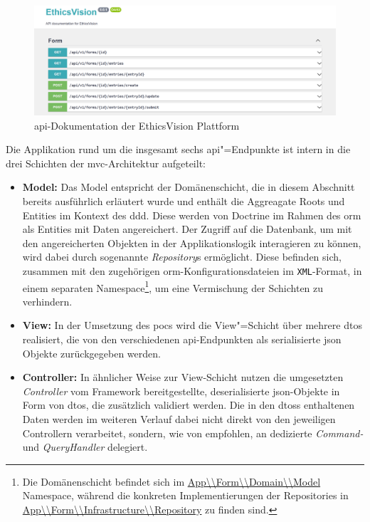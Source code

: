 \documentclass[a4paper,12pt,twoside]{scrreprt}
\begin{document}
\begin{figure}[ht]
    \centering
    \includegraphics[width=\linewidth]{thesis/images/Luidold_EthicsVision-API-Docs.png}
    \caption{\acs{api}-Dokumentation der EthicsVision Plattform}
    \label{fig:ethics-vision-api-docs}
\end{figure}

Die Applikation rund um die insgesamt sechs \ac{api}"=Endpunkte ist intern in die drei Schichten der \ac{mvc}-Architektur aufgeteilt:
\begin{itemize}
    \item \textbf{Model:} Das Model entspricht der Domänenschicht, die in diesem Abschnitt bereits ausführlich erläutert wurde und enthält die Aggreagate Roots und Entities im Kontext des \ac{ddd}. Diese werden von Doctrine im Rahmen des \ac{orm} als Entities mit Daten angereichert. Der Zugriff auf die Datenbank, um mit den angereicherten Objekten in der Applikationslogik interagieren zu können, wird dabei durch sogenannte \textit{Repository}s ermöglicht. Diese befinden sich, zusammen mit den zugehörigen \ac{orm}-Konfigurationsdateien im \texttt{XML}-Format, in einem separaten Namespace\footnote{Die Domänenschicht befindet sich im \url{App\\Form\\Domain\\Model} Namespace, während die konkreten Implementierungen der Repositories in \url{App\\Form\\Infrastructure\\Repository} zu finden sind.}, um eine Vermischung der Schichten zu verhindern.
    \item \textbf{View:} In der Umsetzung des \aclp{poc} wird die View"=Schicht über mehrere \acp{dto} realisiert, die von den verschiedenen \ac{api}-Endpunkten als serialisierte \ac{json} Objekte zurückgegeben werden.
    \item \textbf{Controller:} In ähnlicher Weise zur View-Schicht nutzen die umgesetzten \textit{Controller} vom Framework bereitgestellte, deserialisierte \ac{json}-Objekte in Form von \ac{dto}s, die zusätzlich validiert werden. Die in den \acp{dto}s enthaltenen Daten werden im weiteren Verlauf dabei nicht direkt von den jeweiligen Controllern verarbeitet, sondern, wie von \cite{symfony_sas_best-practices_2023} empfohlen, an dedizierte \textit{Command-} und \textit{QueryHandler} delegiert.
\end{itemize}
\end{document}
